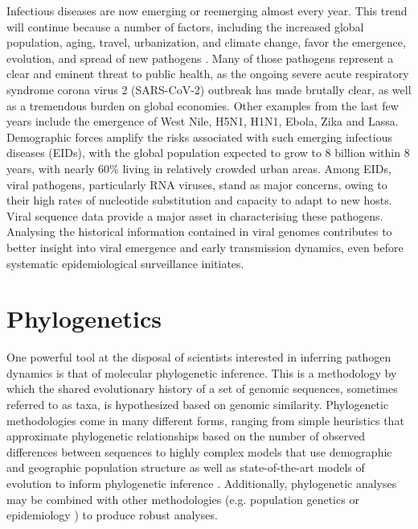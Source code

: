 Infectious diseases are now emerging or reemerging almost every year. 
This trend will continue because a number of factors, including the increased global population, aging, travel, urbanization, and climate change, favor the emergence, evolution, and spread of new pathogens \cite{Bloom2017}.
Many of those pathogens represent a clear and eminent threat to public health, as the ongoing severe acute respiratory syndrome corona virus 2 (SARS-CoV-2) outbreak has made brutally clear, as well as a tremendous burden on global economies.
Other examples from the last few years include the emergence of West Nile, H5N1, H1N1, Ebola, Zika and Lassa.
Demographic forces amplify the risks associated with such emerging infectious diseases (EIDs), with the global population expected to grow to 8 billion within 8 years, with nearly 60\% living in relatively crowded urban areas. 
Among EIDs, viral pathogens, particularly RNA viruses, stand as major concerns, owing to their high rates of nucleotide substitution and capacity to adapt to new hosts.
Viral sequence data provide a major asset in characterising these pathogens. 
Analysing the historical information contained in viral genomes contributes to better insight into viral emergence and early transmission dynamics, even before systematic epidemiological surveillance initiates.



\section{Phylogenetics}

One powerful tool at the disposal of scientists interested in inferring pathogen dynamics is that of molecular phylogenetic inference.
This is a methodology by which the shared evolutionary history of a set of genomic sequences, sometimes referred to as taxa, is hypothesized based on genomic similarity.
Phylogenetic methodologies come in many different forms, ranging from simple heuristics that approximate phylogenetic relationships based on the number of observed differences between sequences \cite{felsenstein2003inferring} to highly complex models that use demographic and geographic population structure as well as state-of-the-art models of evolution to inform phylogenetic inference \cite{dudas2018mers}.
Additionally, phylogenetic analyses may be combined with other methodologies (e.g. population genetics \cite{felsenstein2003inferring} or epidemiology \cite{Black2020}) to produce robust analyses.


